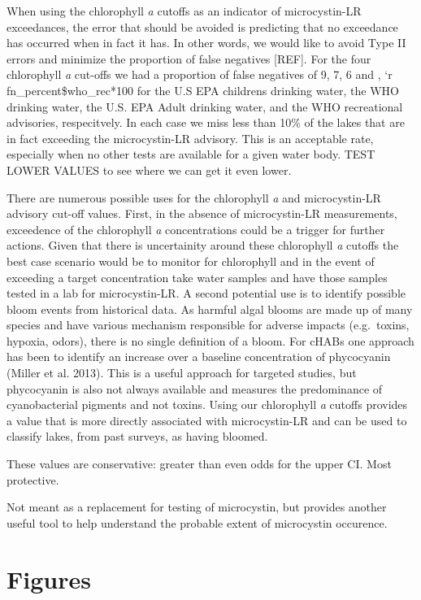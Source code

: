 \documentclass[11pt,]{article}
\begin{document}
When using the chlorophyll \emph{a} cutoffs as an indicator of
microcystin-LR exceedances, the error that should be avoided is
predicting that no exceedance has occurred when in fact it has. In other
words, we would like to avoid Type II errors and minimize the proportion
of false negatives {[}REF{]}. For the four chlorophyll \emph{a} cut-offs
we had a proportion of false negatives of 9, 7, 6 and , `r
fn\_percent\$who\_rec*100 for the U.S EPA childrens drinking water, the
WHO drinking water, the U.S. EPA Adult drinking water, and the WHO
recreational advisories, respecitvely. In each case we miss less than
10\% of the lakes that are in fact exceeding the microcystin-LR
advisory. This is an acceptable rate, especially when no other tests are
available for a given water body. TEST LOWER VALUES to see where we can
get it even lower.

There are numerous possible uses for the chlorophyll \emph{a} and
microcystin-LR advisory cut-off values. First, in the absence of
microcystin-LR measurements, exceedence of the chlorophyll \emph{a}
concentrations could be a trigger for further actions. Given that there
is uncertainity around these chlorophyll \emph{a} cutoffs the best case
scenario would be to monitor for chlorophyll and in the event of
exceeding a target concentration take water samples and have those
samples tested in a lab for microcystin-LR. A second potential use is to
identify possible bloom events from historical data. As harmful algal
blooms are made up of many species and have various mechanism
responsible for adverse impacts (e.g.~toxins, hypoxia, odors), there is
no single definition of a bloom. For cHABs one approach has been to
identify an increase over a baseline concentration of phycocyanin
(Miller et al. 2013). This is a useful approach for targeted studies,
but phycocyanin is also not always available and measures the
predominance of cyanobacterial pigments and not toxins. Using our
chlorophyll \emph{a} cutoffs provides a value that is more directly
associated with microcystin-LR and can be used to classify lakes, from
past surveys, as having bloomed.

These values are conservative: greater than even odds for the upper CI.
Most protective.

Not meant as a replacement for testing of microcystin, but provides
another useful tool to help understand the probable extent of
microcystin occurence.

\newpage

\section{Figures}\label{figures}
\end{document}

